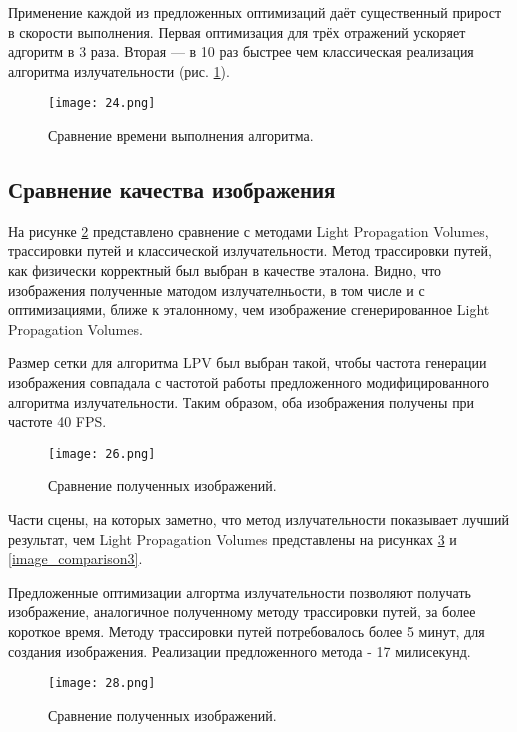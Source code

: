 \documentclass[12pt,fleqn]{article}
\begin{document}
Применение каждой из предложенных оптимизаций даёт существенный прирост в скорости выполнения. Первая оптимизация для трёх отражений ускоряет адгоритм в 3 раза. Вторая --- в 10 раз быстрее чем классическая реализация алгоритма излучательности (рис. \ref{speed_comparison}).

\begin{figure}[htb]
    \centering
    \texttt{[image: 24.png]}
    \caption{Сравнение времени выполнения алгоритма.}
    \label{speed_comparison}
\end{figure}

\pagebreak

\subsection{Сравнение качества изображения}

На рисунке \ref{image_comparison} представлено сравнение с методами Light Propagation Volumes, трассировки путей и классической излучательности. Метод трассировки путей, как физически корректный был выбран в качестве эталона. Видно, что изображения полученные матодом излучателньости, в том числе и с оптимизациями, ближе к эталонному, чем изображение сгенерированное Light Propagation Volumes. 

Размер сетки для алгоритма LPV был выбран такой, чтобы частота генерации изображения совпадала с частотой работы предложенного модифицированного алгоритма излучательности. Таким образом, оба изображения получены при частоте 40 FPS.

\pagebreak

\begin{figure}[htb]
    \centering
    \texttt{[image: 26.png]}
    \caption{Сравнение полученных изображений.}
    \label{image_comparison}
\end{figure}

Части сцены, на которых заметно, что метод излучательности показывает лучший результат, чем Light Propagation Volumes представлены на рисунках \ref{image_comparison2} и \ref{image_comparison3}.

Предложенные оптимизации алгортма излучательности позволяют получать изображение, аналогичное полученному методу трассировки путей, за более короткое время. Методу трассировки путей потребовалось более 5 минут, для создания изображения. Реализации предложенного метода - 17 милисекунд.

\pagebreak

\begin{figure}[htb]
    \centering
    \texttt{[image: 28.png]}
    \caption{Сравнение полученных изображений.}
    \label{image_comparison2}
\end{figure}
\end{document}
